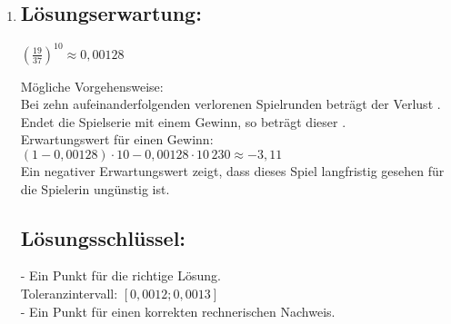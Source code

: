 \begin{langesbeispiel}
{\begin{enumerate}
$P(X\geq 4)\approx 0,171$

a die Spieldurchgänge voneinander unabhängig sind und somit die Ergebnisse der vorherigen Spielrunden keine Auswirkungen auf die nachfolgenden Spielrunden haben, kann der Spieler seine Gewinnchancen mit dieser Strategie nicht beeinflussen.

\subsection{Lösungsschlüssel:}

- Ein Punkt für die richtige Lösung.\\
Toleranzintervall für $P(X\geq 4):[0,1; 0,2]$ bzw, $[10\,\%; 20\,\%]$\\
- Ein Punkt für die Angabe, dass der Spieler seine Gewinnchancen mit dieser Strategie nicht erhöhen kann, und eine korrekte Begründung.

\item \subsection{Lösungserwartung:}

$\left(\frac{19}{37}\right)^{10}\approx 0,00128$

Mögliche Vorgehensweise:\\
Bei zehn aufeinanderfolgenden verlorenen Spielrunden beträgt der Verlust .\\
Endet die Spielserie mit einem Gewinn, so beträgt dieser .\\
Erwartungswert für einen Gewinn: $(1-0,00128)\cdot 10-0,00128\cdot 10\,230\approx -3,11$\\
Ein negativer Erwartungswert zeigt, dass dieses Spiel langfristig gesehen für die Spielerin ungünstig ist.

\subsection{Lösungsschlüssel:}
- Ein Punkt für die richtige Lösung.\\
Toleranzintervall: $[0,0012; 0,0013]$\\
- Ein Punkt für einen korrekten rechnerischen Nachweis.

\end{enumerate}}
\end{langesbeispiel}